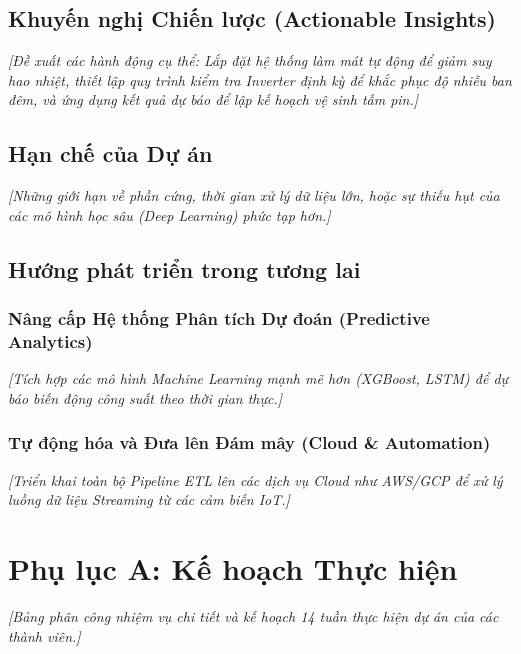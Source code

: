 \documentclass[12pt, a4paper]{report}
\begin{document}
\section{Khuyến nghị Chiến lược (Actionable Insights)}
\label{sec:recommendations}
\textit{[Đề xuất các hành động cụ thể: Lắp đặt hệ thống làm mát tự động để giảm suy hao nhiệt, thiết lập quy trình kiểm tra Inverter định kỳ để khắc phục độ nhiễu ban đêm, và ứng dụng kết quả dự báo để lập kế hoạch vệ sinh tấm pin.]}

\section{Hạn chế của Dự án}
\label{sec:limitations}
\textit{[Những giới hạn về phần cứng, thời gian xử lý dữ liệu lớn, hoặc sự thiếu hụt của các mô hình học sâu (Deep Learning) phức tạp hơn.]}

\section{Hướng phát triển trong tương lai}
\label{sec:future_work}
\subsection{Nâng cấp Hệ thống Phân tích Dự đoán (Predictive Analytics)}
\textit{[Tích hợp các mô hình Machine Learning mạnh mẽ hơn (XGBoost, LSTM) để dự báo biến động công suất theo thời gian thực.]}

\subsection{Tự động hóa và Đưa lên Đám mây (Cloud \& Automation)}
\textit{[Triển khai toàn bộ Pipeline ETL lên các dịch vụ Cloud như AWS/GCP để xử lý luồng dữ liệu Streaming từ các cảm biến IoT.]}

\newpage
\chapter*{Phụ lục A: Kế hoạch Thực hiện}
\label{app:kehoach}
\textit{[Bảng phân công nhiệm vụ chi tiết và kế hoạch 14 tuần thực hiện dự án của các thành viên.]}


\end{document}
